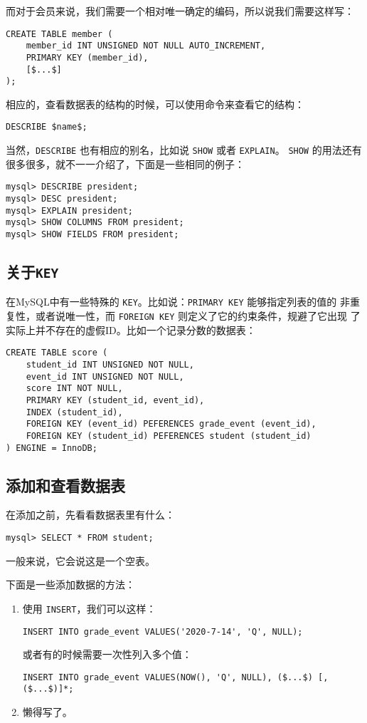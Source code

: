 而对于会员来说，我们需要一个相对唯一确定的编码，所以说我们需要这样写：
\begin{lstlisting}
CREATE TABLE member (
    member_id INT UNSIGNED NOT NULL AUTO_INCREMENT,
    PRIMARY KEY (member_id),
    [$...$]
);
\end{lstlisting}

相应的，查看数据表的结构的时候，可以使用命令来查看它的结构：
\begin{lstlisting}
DESCRIBE $name$;
\end{lstlisting}

当然，\verb|DESCRIBE| 也有相应的别名，比如说 \verb|SHOW| 或者 \verb|EXPLAIN|。
\verb|SHOW| 的用法还有很多很多，就不一一介绍了，下面是一些相同的例子：
\begin{lstlisting}
mysql> DESCRIBE president;
mysql> DESC president;
mysql> EXPLAIN president;
mysql> SHOW COLUMNS FROM president;
mysql> SHOW FIELDS FROM president;
\end{lstlisting}

\subsection{关于{\tt KEY}}

在MySQL中有一些特殊的 \verb|KEY|。比如说：\verb|PRIMARY KEY| 能够指定列表的值的
非重复性，或者说唯一性，而 \verb|FOREIGN KEY| 则定义了它的约束条件，规避了它出现
了实际上并不存在的虚假ID。比如一个记录分数的数据表：
\begin{lstlisting}
CREATE TABLE score (
    student_id INT UNSIGNED NOT NULL,
    event_id INT UNSIGNED NOT NULL,
    score INT NOT NULL,
    PRIMARY KEY (student_id, event_id),
    INDEX (student_id),
    FOREIGN KEY (event_id) PEFERENCES grade_event (event_id),
    FOREIGN KEY (student_id) PEFERENCES student (student_id)
) ENGINE = InnoDB;
\end{lstlisting}

\subsection{添加和查看数据表}

在添加之前，先看看数据表里有什么：
\begin{lstlisting}
mysql> SELECT * FROM student;
\end{lstlisting}

一般来说，它会说这是一个空表。

下面是一些添加数据的方法：

\begin{enumerate}
\item
使用 \verb|INSERT|，我们可以这样：
\begin{lstlisting}
INSERT INTO grade_event VALUES('2020-7-14', 'Q', NULL);
\end{lstlisting}

或者有的时候需要一次性列入多个值：
\begin{lstlisting}
INSERT INTO grade_event VALUES(NOW(), 'Q', NULL), ($...$) [, ($...$)]*;
\end{lstlisting}

\item
懒得写了。
\end{enumerate}

